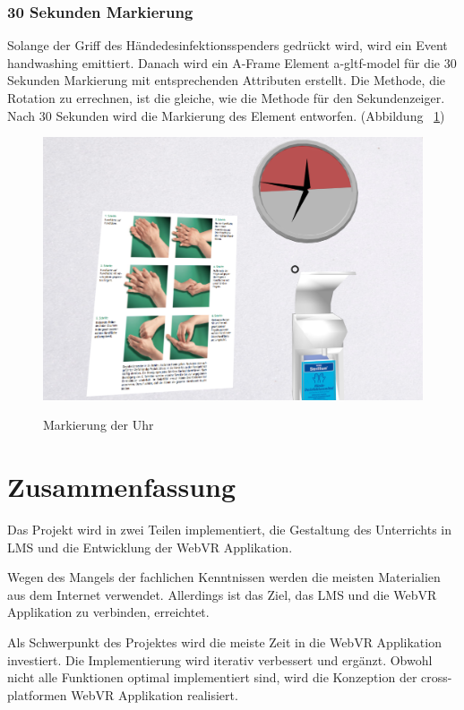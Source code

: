  \subsubsection{30 Sekunden Markierung}
 Solange der Griff des Händedesinfektionsspenders gedrückt wird, wird ein Event {\selectfont  handwashing} emittiert. Danach wird ein A-Frame Element {\selectfont  a-gltf-model} für die 30 Sekunden Markierung mit entsprechenden Attributen erstellt. Die Methode, die Rotation zu errechnen, ist die gleiche, wie die Methode für den Sekundenzeiger. Nach 30 Sekunden wird die Markierung des Element entworfen. (Abbildung ~\ref{fig:clockMarker})
 
\begin{figure}[ht]
\vspace*{1em}
\centering
\caption[Markierung der Uhr]{Markierung der Uhr}
\includegraphics[width=\textwidth]{images/clockMarker.png}
\label{fig:clockMarker} 
\end{figure}

\section{Zusammenfassung}
Das Projekt wird in zwei Teilen implementiert, die Gestaltung des Unterrichts in LMS und die Entwicklung der WebVR Applikation.

Wegen des Mangels der fachlichen Kenntnissen werden die meisten Materialien aus dem Internet verwendet. Allerdings ist das Ziel, das LMS und die WebVR Applikation zu verbinden, erreichtet.

Als Schwerpunkt des Projektes wird die meiste Zeit in die WebVR Applikation investiert. Die Implementierung wird iterativ verbessert und ergänzt. Obwohl nicht alle Funktionen optimal implementiert sind, wird die Konzeption der cross-platformen WebVR Applikation realisiert.
